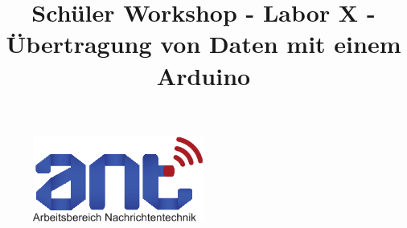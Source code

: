 \documentclass[12pt,a4paper]{article}
\begin{document}

\title{Schüler Workshop - Labor X - Übertragung von Daten mit einem Arduino}
\maketitle
\begin{figure}[H]
    \centering
    \includegraphics[width=0.5\textwidth]{logos/antlogo.pdf}
\end{figure}

\author{}
\date{}





% 
\end{document}
